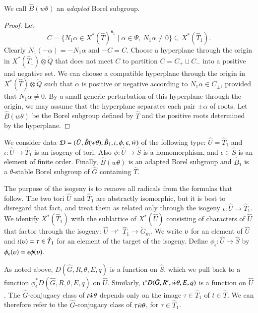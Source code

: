 We call $\hat B(w\theta)$ an {\it adapted} Borel subgroup.

\begin{proof}  Let 
\[
C = \{N_1\alpha\in X^*(\hat T)^{\theta_1} \mid \alpha\in\Psi,\ N_1\alpha\ne 0\}
\subseteq X^*(\hat T_1).
\]
Clearly $N_1(-\alpha)= - N_1\alpha$ and $-C = C$.  Choose a hyperplane
through the origin in $X^*(\hat T_1)\otimes\ring{Q}$ that does not
meet $C$ to partition $C = C_+ \sqcup C_-$ into a positive and
negative set.  We can choose a compatible hyperplane through the
origin in $X^*(\hat T)\otimes\ring{Q}$ such that $\alpha$ is positive
or negative according to $N_1\alpha\in C_\pm$, provided that
$N_1\alpha\ne 0$.  By a small generic perturbation of this hyperplane
through the origin, we may assume that the hyperplane separates each
pair $\pm \alpha$ of roots. 
Let $\hat B(w\theta)$ be the Borel subgroup defined by $\hat T$ and
the positive roots determined by the hyperplane.
\end{proof}

We consider data $\mathcal D=(\hat U,\hat B(w\theta),\hat
B_1,\iota,\phi,\epsilon,\dot w)$ of the following type: $\hat U = \hat
T_1$ and $\iota:\hat U\to \hat T_1$ is an isogeny of tori.  Also
$\phi:\hat U\to \hat S$ is a homomorphism, and $\epsilon\in \hat S$ is
an element of finite order.  Finally, $\hat B(w\theta)$ is an
adapted Borel subgroup and $\hat B_1$ is a $\theta$-stable
Borel subgroup of $\hat G$ containing $\hat T$.

The purpose of the isogeny is to remove all radicals from the formulas
that follow.  The two tori $\hat U$ and $\hat T_1$ are abstractly
isomorphic,
but it is best to disregard that fact, and treat them as related only
through the isogeny $\iota:\hat U\to \hat T_1$.   We identify
$X^*(\hat T_1)$ with the sublattice of $X^*(\hat U)$ consisting of characters of
$\hat U$ that factor through the isogeny: $\hat U\to^\iota\ \hat
T_1\to \ring{G}_m$.
We write $\upsilon$ for an
element of $\hat U$ and $\iota(\upsilon)=\tau\in \hat T_1$ for an element
of the target of the isogeny.  Define $\phi_\epsilon:\hat U\to\hat S$
by $\phi_\epsilon(\upsilon)= \epsilon\phi(\upsilon)$.

As noted above, $D(\hat G,R,\theta,E,q)$ is a function on $\hat S$,
which we pull back to a function $\phi^*_\epsilon D(\hat
G,R,\theta,E,q)$ on $\hat U$.  Similarly, $\iota^* D(\hat G,R',\dot w
\theta,E,q)$ is a function on $\hat U$.  The $\hat G$-conjugacy class
of $t\dot w \theta$ depends only on the image $\tau\in \hat T_1$ of
$t\in \hat T$.  We can therefore refer to the $\hat G$-conjugacy class
of $\tau\dot w\theta$, for $\tau\in \hat T_1$.

